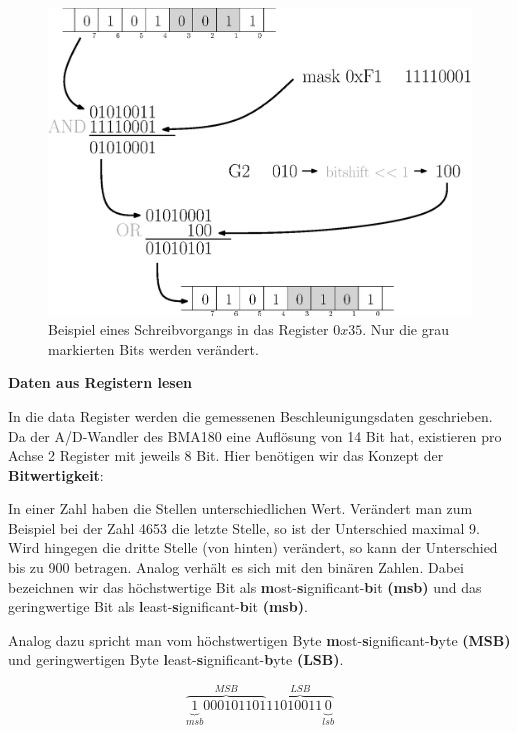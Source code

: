 \documentclass[12pt,a4paper]{scrartcl}
\begin{document}
\begin{figure}[H]
\centering
\includegraphics[scale=.5]{bitops.eps}
\caption{Beispiel eines Schreibvorgangs in das Register $0x35$. Nur die grau markierten Bits werden verändert.}
\label{bitops}
\end{figure}

\textbf{Daten aus Registern lesen}

In die data Register werden die gemessenen Beschleunigungsdaten geschrieben. Da der A/D-Wandler des BMA180 eine Auflösung von 14 Bit hat, existieren pro Achse 2 Register mit jeweils 8 Bit. 
Hier benötigen wir das Konzept der \textbf{Bitwertigkeit}:

In einer Zahl haben die Stellen unterschiedlichen Wert. Verändert man zum Beispiel bei der Zahl 4653 die letzte Stelle, so ist der Unterschied maximal 9. Wird hingegen die dritte Stelle (von hinten) verändert, so kann der Unterschied bis zu 900 betragen. Analog verhält es sich mit den binären Zahlen. 
Dabei bezeichnen wir das höchstwertige Bit als \textbf{m}ost-\textbf{s}ignificant-\textbf{b}it \textbf{(msb)} und das geringwertige Bit als \textbf{l}east-\textbf{s}ignificant-\textbf{b}it \textbf{(msb)}.

Analog dazu spricht man vom höchstwertigen Byte \textbf{m}ost-\textbf{s}ignificant-\textbf{b}yte \textbf{(MSB)} und geringwertigen Byte \textbf{l}east-\textbf{s}ignificant-\textbf{b}yte \textbf{(LSB)}.

\begin{equation}
\overbrace {\underbrace{1}_{msb}000101101}^{MSB}\overbrace {11010011\underbrace{0}_{lsb}}^{LSB}
\end{equation}
\end{document}

